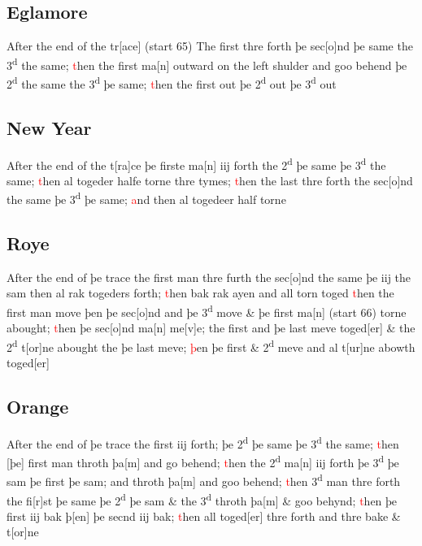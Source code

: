 \documentclass[12pt,letter]{article} %
\newcommand{\red}[1]{\textcolor{red}{#1}}
\newcommand{\srcpg}[1]{(start #1)}
\begin{document}
\subsection{Eglamore}
After the end of the tr{[}ace{]} \srcpg{65} The first thre forth þe
sec{[}o{]}nd þe same the 3\textsuperscript{d} the same; \red{t}hen the first
ma{[}n{]} outward on the left shulder and goo behend þe
2\textsuperscript{d} the same the 3\textsuperscript{d} þe same; \red{t}hen the
first out þe 2\textsuperscript{d} out þe 3\textsuperscript{d} out

\subsection{New Year}
After the end of the t{[}ra{]}ce þe firste ma{[}n{]} iij forth the
2\textsuperscript{d} þe same þe 3\textsuperscript{d} the same; \red{t}hen al
togeder halfe torne thre tymes; \red{t}hen the last thre forth the
sec{[}o{]}nd the same þe 3\textsuperscript{d} þe same; \red{a}nd then al
togedeer half torne

\subsection{Roye}
After the end of þe trace the first man thre furth the sec{[}o{]}nd the
 same þe iij the sam then al rak togeders forth; \red{t}hen bak rak ayen and
all torn toged \red{t}hen the first man move þen þe sec{[}o{]}nd and þe
3\textsuperscript{d} move \& þe first ma{[}n{]} \srcpg{66} torne
abought; \red{t}hen þe sec{[}o{]}nd ma{[}n{]} me{[}v{]}e; the first and þe
last meve toged{[}er{]} \& the 2\textsuperscript{d} t{[}or{]}ne abought
the þe last meve; \red{þ}en þe first \& 2\textsuperscript{d} meve and al
t{[}ur{]}ne abowth toged{[}er{]}

\subsection{Orange}
After the end of þe trace the first iij forth; þe 2\textsuperscript{d}
þe same þe 3\textsuperscript{d} the same; \red{t}hen {[}þe{]} first man throth
þa{[}m{]} and go behend; \red{t}hen the 2\textsuperscript{d} ma{[}n{]} iij
forth þe 3\textsuperscript{d} þe sam þe first þe sam; and throth
þa{[}m{]} and goo behend; \red{t}hen 3\textsuperscript{d} man thre forth the 
fi{[}r{]}st þe same þe 2\textsuperscript{d} þe sam \& the
3\textsuperscript{d} throth þa{[}m{]} \& goo behynd; \red{t}hen þe first iij
bak þ{[}en{]} þe secnd iij bak; \red{t}hen all toged{[}er{]} thre forth and
thre bake \& t{[}or{]}ne
\end{document}
